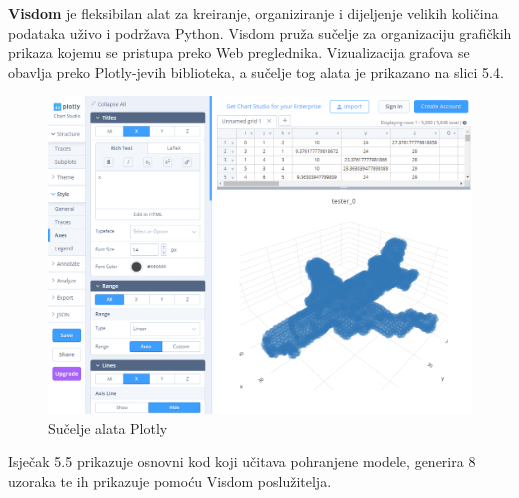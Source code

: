 \documentclass[times, utf8, diplomski]{fer}
\begin{document}
\textbf{Visdom} je fleksibilan alat za kreiranje, organiziranje i dijeljenje velikih količina podataka uživo i podržava Python. Visdom pruža sučelje za organizaciju grafičkih prikaza kojemu se pristupa preko Web preglednika. \cite{visdom} Vizualizacija grafova se obavlja preko Plotly-jevih biblioteka, a sučelje tog alata je prikazano na slici 5.4.
\\

\begin{figure}[h]
\centering
\includegraphics[scale=0.5]{sucelje_plotly.png}   
\caption{Sučelje alata Plotly}
\end{figure}

\break

Isječak 5.5 prikazuje osnovni kod koji učitava pohranjene modele, generira 8 uzoraka te ih prikazuje pomoću Visdom poslužitelja.
\\
\end{document}
